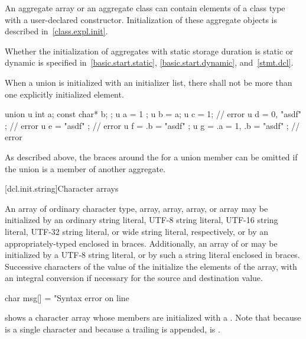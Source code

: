 \pnum
{}%
\begin{note}
An aggregate array or an aggregate class can contain elements of a
class type with a user-declared constructor.
Initialization of these aggregate objects is described in~\ref{class.expl.init}.
\end{note}

\pnum
\begin{note}
Whether the initialization of aggregates with static storage duration
is static or dynamic is specified
in~\ref{basic.start.static}, \ref{basic.start.dynamic}, and~\ref{stmt.dcl}.
\end{note}

\pnum
{}%
When a union is initialized with an initializer list,
there shall not be more than one
explicitly initialized element.
\begin{example}
\begin{codeblock}
union u { int a; const char* b; };
u a = { 1 };
u b = a;
u c = 1;                        // error
u d = { 0, "asdf" };            // error
u e = { "asdf" };               // error
u f = { .b = "asdf" };
u g = { .a = 1, .b = "asdf" };  // error
\end{codeblock}
\end{example}

\pnum
\begin{note}
As described above,
the braces around the
for a union member can be omitted if the
union is a member of another aggregate.
\end{note}

[dcl.init.string]{Character arrays}%

\pnum
{}%
%
%
An array of ordinary character type,
 array,
 array,
 array,
or  array
may be initialized by
an ordinary string literal,
UTF-8 string literal,
UTF-16 string literal,
UTF-32 string literal, or
wide string literal,
respectively, or by an appropriately-typed  enclosed in
braces.
Additionally, an array of  or
may be initialized by
a UTF-8 string literal, or by
such a string literal enclosed in braces.
%
Successive
characters of the
value of the 
initialize the elements of the array,
with an integral conversion
if necessary for the source and destination value.
\begin{example}
\begin{codeblock}
char msg[] = "Syntax error on line %
\end{codeblock}
shows a character array whose members are initialized
with a
.
Note that because
is a single character and
because a trailing
is appended,
is
.
\end{example}

